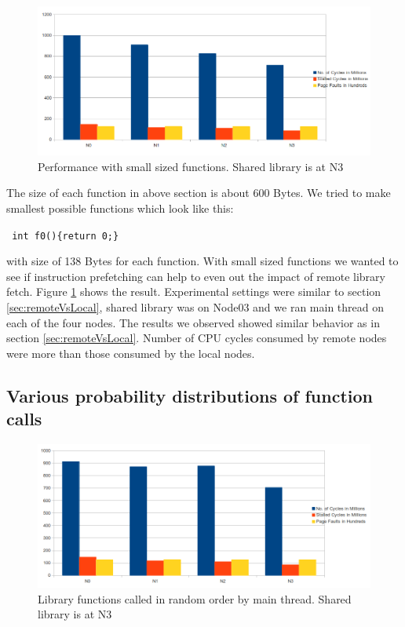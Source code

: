 \begin{figure}
    \centering
    \includegraphics[scale=0.35]{smallFunc.png}
    \caption{Performance with small sized functions. Shared library is at N3 }
    \label{fig:smallFunc}
\end{figure}

The size of each function in above section is about 600 Bytes.
We tried to make smallest possible functions which look like this:

\texttt{ int f0()\{return 0;\} }

with size of 138 Bytes for each function.
With small sized functions we wanted to see if instruction prefetching can help to even out the impact of remote library fetch.
Figure \ref{fig:smallFunc} shows the result.
Experimental settings were similar to section \ref{sec:remoteVsLocal}, shared library was on Node03 and we ran main thread on each of the four nodes.
The results we observed showed similar behavior as in section \ref{sec:remoteVsLocal}.
Number of CPU cycles consumed by remote nodes were more than those consumed by the local nodes.



\subsection{Various probability distributions of function calls}

\begin{figure}
    \centering
    \includegraphics[scale=0.35]{randomDistribution.png}
    \caption{Library functions called in random order by main thread. Shared library is at N3 }
    \label{fig:randomDistribution}
\end{figure}

